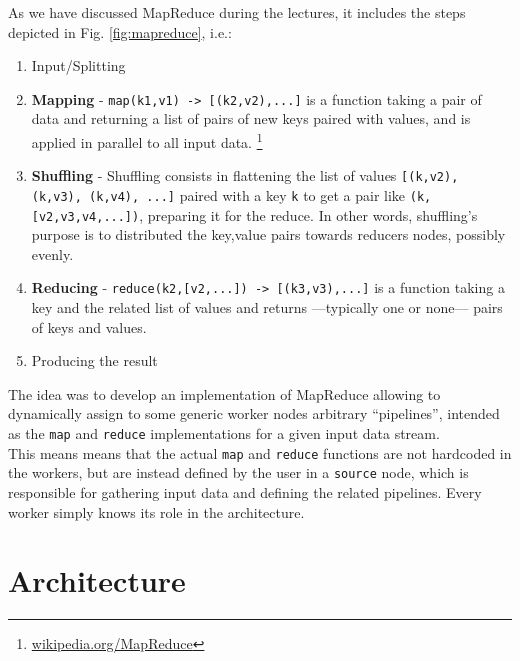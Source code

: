 {As we have discussed MapReduce during the lectures, it includes the steps depicted in Fig. \ref{fig:mapreduce}, i.e.:\ns
\begin{enumerate}
   \item Input/Splitting
   \item \textbf{Mapping} - \lstinline{map(k1,v1) -> [(k2,v2),...]} is a function taking a pair of data and returning a list of pairs of new keys paired with values, and is applied in parallel to all input data.
   \footnote{\href{https://en.wikipedia.org/wiki/MapReduce}{wikipedia.org/MapReduce}}
   \item \textbf{Shuffling} - Shuffling consists in flattening the list of values \lstinline{[(k,v2), (k,v3), (k,v4), ...]} paired with a key \texttt{k} to get a pair like \lstinline|(k,[v2,v3,v4,...])|, preparing it for the reduce. In other words, shuffling's purpose is to distributed the key,value pairs towards reducers nodes, possibly evenly. 
   \item \textbf{Reducing} - \lstinline|reduce(k2,[v2,...]) -> [(k3,v3),...]| is a function taking a key and the related list of values and returns ---typically one or none--- pairs of keys and values. 
   \item Producing the result
\end{enumerate}}

The idea was to develop an implementation of MapReduce allowing to dynamically assign to some generic worker nodes arbitrary ``pipelines'', intended as the \lstinline|map| and \lstinline|reduce| implementations for a given input data stream.\\
This means means that the actual \lstinline|map| and \lstinline|reduce| functions are not hardcoded in the workers, but are instead defined by the user in a \texttt{source} node, which is responsible for gathering input data and defining the related pipelines.
Every worker simply knows its role in the architecture.

\section{Architecture}

